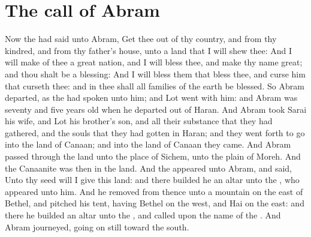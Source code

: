 \section*{The call of Abram}
\begin{biblechapter} %
\verse Now the \LORD had said unto Abram, Get thee out of thy country, and from thy kindred, and from thy father's house, unto a land that I will shew thee:
\verse And I will make of thee a great nation, and I will bless thee, and make thy name great; and thou shalt be a blessing:
\verse And I will bless them that bless thee, and curse him that curseth thee: and in thee shall all families of the earth be blessed.
\verse So Abram departed, as the \LORD had spoken unto him; and Lot went with him: and Abram was seventy and five years old when he departed out of Haran.
\verse And Abram took Sarai his wife, and Lot his brother's son, and all their substance that they had gathered, and the souls that they had gotten in Haran; and they went forth to go into the land of Canaan; and into the land of Canaan they came.
\verse And Abram passed through the land unto the place of Sichem, unto the plain of Moreh. And the Canaanite was then in the land.
\verse And the \LORD appeared unto Abram, and said, Unto thy seed will I give this land: and there builded he an altar unto the \LORD, who appeared unto him.
\verse And he removed from thence unto a mountain on the east of Bethel, and pitched his tent, having Bethel on the west, and Hai on the east: and there he builded an altar unto the \LORD, and called upon the name of the \LORD.
\verse And Abram journeyed, going on still toward the south.

\end{biblechapter}
